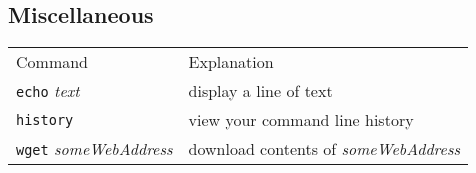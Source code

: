 \subsection{Miscellaneous}
\begin{tabular}{ll}
  Command & Explanation \\
  \hhline{==}
  \texttt{echo} \textit{text} & display a line of text \\
  \texttt{history} & view your command line history \\
  \texttt{wget} \textit{someWebAddress} & download contents of \textit{someWebAddress} \\
\end{tabular}  

